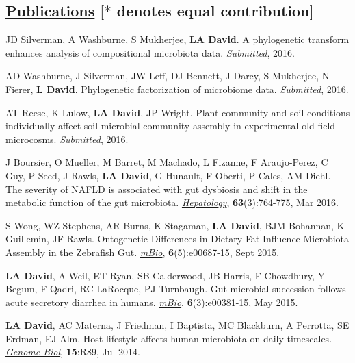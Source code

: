 \documentclass[overlapped,line,11pt]{res}
\begin{document}
\begin{resume}
\section{\underline{\sc Publications} \hspace{2.95in} \sc $[\ast$ denotes equal
      contribution$]$}

\vspace{.25in}

\begin{revnumerate}[17]

\item {JD Silverman, A Washburne, S Mukherjee, \textbf{LA David}. A
  phylogenetic transform enhances analysis of compositional microbiota
  data. \emph{Submitted}, 2016.}

\item {AD Washburne, J Silverman, JW Leff, DJ Bennett, J Darcy, S
  Mukherjee, N Fierer, \textbf{L David}. Phylogenetic factorization of
  microbiome data. \emph{Submitted}, 2016.}

\item {AT Reese, K Lulow, \textbf{LA David}, JP Wright. Plant
  community and soil conditions individually affect soil microbial
  community assembly in experimental old-field
  microcosms. \emph{Submitted}, 2016.}

\item {J Boursier, O Mueller, M Barret, M Machado, L Fizanne, F
  Araujo-Perez, C Guy, P Seed, J Rawls, \textbf{LA David}, G Hunault, F
  Oberti, P Cales, AM Diehl. The severity of NAFLD is associated with
  gut dysbiosis and shift in the metabolic function of the gut
  microbiota. \emph{\underline{Hepatology}}, \textbf{63}(3):764-775, Mar 2016.}

\item {S Wong, WZ Stephens, AR Burns, K Stagaman, \textbf{LA David},
  BJM Bohannan, K Guillemin, JF Rawls.  Ontogenetic Differences in
  Dietary Fat Influence Microbiota Assembly in the Zebrafish Gut.
  \emph{\underline{mBio}}, \textbf{6}(5):e00687-15, Sept 2015.}

\item {\textbf{LA David}, A Weil, ET Ryan, SB Calderwood, JB Harris, F
  Chowdhury, Y Begum, F Qadri, RC LaRocque, PJ Turnbaugh.  Gut
  microbial succession follows acute secretory diarrhea in humans.
 \emph{\underline{mBio}}, \textbf{6}(3):e00381-15, May 2015.}

\item {\textbf{LA David}, AC Materna, J Friedman, I Baptista, MC
  Blackburn, A Perrotta, SE Erdman, EJ Alm.  Host lifestyle affects
  human microbiota on daily timescales.
  \emph{\underline{Genome Biol}}, \textbf{15}:R89, Jul 2014.}


\end{revnumerate}
\end{resume}
\end{document}
